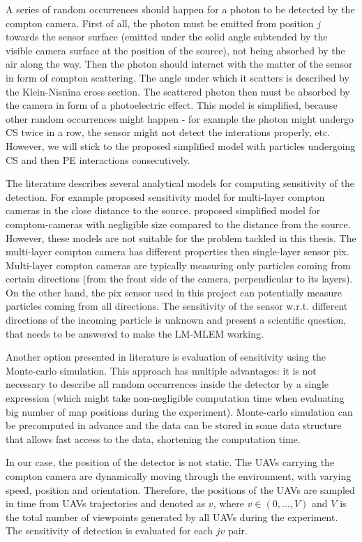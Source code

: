 A series of random occurrences should happen for a photon to be detected by the compton camera.
First of all, the photon must be emitted from position $j$ towards the sensor surface (emitted under the solid angle subtended by the visible camera surface at the position of the source), not being absorbed by the air along the way.
Then the photon should interact with the matter of the sensor in form of compton scattering.
The angle under which it scatters is described by the Klein-Nisnina cross section.
The scattered photon then must be absorbed by the camera in form of a photoelectric effect.
This model is simplified, because other random occurrences might happen - for example the photon might undergo \ac{CS} twice in a row, the sensor might not detect the interations properly, etc.
However, we will stick to the proposed simplified model with particles undergoing \ac{CS} and then \ac{PE} interactions consecutively.

The literature describes several analytical models for computing sensitivity of the detection. 
For example \cite{wilderman2001} proposed sensitivity model for multi-layer compton cameras in the close distance to the source.
\cite{maxim2016} proposed simplified model for comptom-cameras with negligible size compared to the distance from the source.
However, these models are not suitable for the problem tackled in this thesis.
The multi-layer compton camera has different properties then single-layer sensor \ac{pix}.
Multi-layer compton cameras are typically measuring only particles coming from certain directions (from the front side of the camera, perpendicular to its layers).
On the other hand, the \ac{pix} sensor used in this project can potentially measure particles coming from all directions.
The sensitivity of the sensor w.r.t. different directions of the incoming particle is unknown and present a scientific question, that needs to be answered to make the \ac{LM-MLEM} working. 

Another option presented in literature is evaluation of sensitivity using the Monte-carlo simulation.
This approach has multiple advantages: it is not necessary to describe all random occurrences inside the detector by a single expression (which might take non-negligible computation time when evaluating big number of map positions during the experiment).
Monte-carlo simulation can be precomputed in advance and the data can be stored in some data structure that allows fast access to the data, shortening the computation time.

In our case, the position of the detector is not static. 
The \ac{UAV}s carrying the compton camera are dynamically moving through the environment, with varying speed, position and orientation.
Therefore, the positions of the \ac{UAV}s are sampled in time from \ac{UAV}s trajectories and denoted as $v$, where $v \in (0, \dots , V)$ and $V$ is the total number of viewpoints generated by all \ac{UAV}s during the experiment.
The sensitivity of detection is evaluated for each $jv$ pair. 

